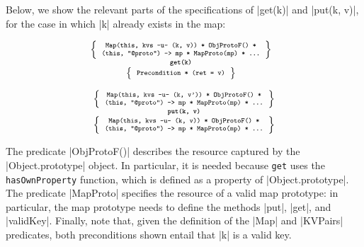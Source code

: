 Below, we show the relevant parts of the specifications of \jsinline|get(k)| and \jsinline|put(k, v)|, for the case in which
 \jsinline|k| already exists in the map:

\noindent
\begin{minipage}{0.475\textwidth}
\begin{displaymath} 
{\scriptsize
\hspace*{-0.2cm}
\begin{array}{c}
\left\{ {\begin{array}{c}
 \text{\texttt{Map(this, kvs -u- (k, v)) * ObjProtoF() *}} \\
 \text{\texttt{(this, "@proto") -> mp * MapProto(mp) * ...}}
\end{array}} \right\} \\
%
\text{\bfseries \texttt{get(k)}} \\[0.2mm]
%
\left\{ {\begin{array}{c}
 \text{\texttt{Precondition * (ret = v)}} 
\end{array}} \right\}
\end{array}
} 
\end{displaymath}
\end{minipage}
\quad
\begin{minipage}{0.48\textwidth}
%
\begin{displaymath} 
{\scriptsize
\begin{array}{c}
\left\{ {\begin{array}{c}
 \text{\texttt{Map(this, kvs -u- (k, v')) * ObjProtoF() *}} \\
 \text{\texttt{(this, "@proto") -> mp * MapProto(mp) * ...}}
\end{array}} \right\} \\
%
\text{\bfseries \texttt{put(k, v)}} \\[0.2mm]
%
\left\{ {\begin{array}{c}
 \text{\texttt{Map(this, kvs -u- (k, v)) * ObjProtoF() *}} \\
 \text{\texttt{(this, "@proto") -> mp * MapProto(mp) * ...}}
\end{array}} \right\}
\end{array}
} 
\end{displaymath}
\end{minipage}

\vspace{10pt}
The predicate \jsinline|ObjProtoF()| describes the resource captured by the \jsinline|Object.prototype| object. 
In particular, it is needed because \texttt{get} uses the \texttt{hasOwnProperty} function, which is defined as a property of \jsinline|Object.prototype|. 
The predicate \jsinline|MapProto| specifies the resource of a valid map prototype: in particular, the map prototype needs to define the methods \jsinline|put|, \jsinline|get|, and \jsinline|validKey|. Finally, note that, given the definition of the \jsinline|Map| and \jsinline|KVPairs| predicates, both preconditions shown entail that \jsinline|k| is a valid key.



